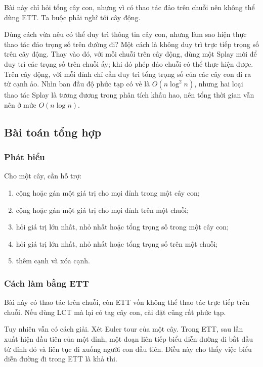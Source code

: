 \documentclass[11pt]{article}
\begin{document}
Bài này chỉ hỏi tổng cây con, nhưng vì có thao tác đảo trên chuỗi nên không thể
dùng ETT. Ta buộc phải nghĩ tới cây động.

Dùng cách vừa nêu có thể duy trì thông tin cây con, nhưng làm sao hiện thực thao
tác đảo trọng số trên đường đi? Một cách là không duy trì trực tiếp trọng số trên
cây động. Thay vào đó, với mỗi chuỗi trên cây động, dùng một Splay mới để duy
trì các trọng số trên chuỗi ấy; khi đó phép đảo chuỗi có thể thực hiện được. Trên
cây động, với mỗi đỉnh chỉ cần duy trì tổng trọng số của các cây con đi ra từ
cạnh ảo. Nhìn ban đầu độ phức tạp có vẻ là \(O(n\log^2 n)\), nhưng hai loại thao
tác Splay là tương đương trong phân tích khấu hao, nên tổng thời gian vẫn nên ở
mức \(O(n\log n)\).

\subsection{Bài toán tổng hợp}

\subsubsection{Phát biểu}

Cho một cây, cần hỗ trợ:
\begin{enumerate}
  \item cộng hoặc gán một giá trị cho mọi đỉnh trong một cây con;
  \item cộng hoặc gán một giá trị cho mọi đỉnh trên một chuỗi;
  \item hỏi giá trị lớn nhất, nhỏ nhất hoặc tổng trọng số trong một cây con;
  \item hỏi giá trị lớn nhất, nhỏ nhất hoặc tổng trọng số trên một chuỗi;
  \item thêm cạnh và xóa cạnh.
\end{enumerate}

\subsubsection{Cách làm bằng ETT}

Bài này có thao tác trên chuỗi, còn ETT vốn không thể thao tác trực tiếp trên
chuỗi. Nếu dùng LCT mà lại có tag cây con, cài đặt cũng rất phức tạp.

Tuy nhiên vẫn có cách giải. Xét Euler tour của một cây. Trong ETT, sau lần xuất
hiện đầu tiên của một đỉnh, một đoạn liên tiếp biểu diễn đường đi bắt đầu từ
đỉnh đó và liên tục đi xuống người con đầu tiên. Điều này cho thấy việc biểu
diễn đường đi trong ETT là khả thi.
\end{document}
